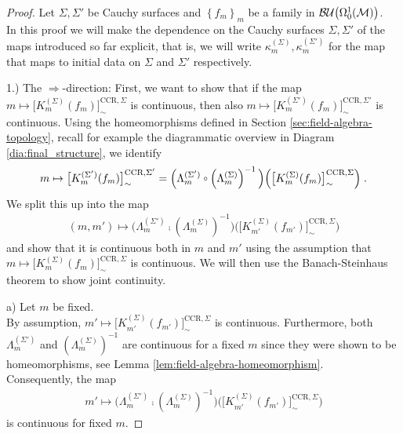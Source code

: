 \begin{proof}
	Let $\Sigma, \Sigma'$ be Cauchy surfaces and $\left\{ f_m \right\}_m$ be a family in ${\mathcal{BU}\big(\Omega^1_0(\mathcal{M})\big)}$.\\
In this proof we will make the dependence on the Cauchy surfaces $\Sigma, \Sigma'$ of the maps introduced so far explicit, that is, we will write $\kappa_m^{(\Sigma)}, \kappa_m^{(\Sigma')}$ for the map that maps to initial data on $\Sigma$ and $\Sigma'$ respectively.\par
1.) The $\Rightarrow$-direction: First, we want to show that if the map $m \mapsto \big[  K_m^{(\Sigma)}(f_m) \big]_\sim^{\text{CCR},\Sigma}$ is continuous, then also $m \mapsto \big[  K_m^{(\Sigma')}(f_m) \big]_\sim^{\text{CCR},\Sigma'}$ is continuous. Using the homeomorphisms defined in Section \ref{sec:field-algebra-topology}, recall for example the diagrammatic overview in Diagram \ref{dia:final_structure}, we identify
\begin{align}
	m \mapsto \big[  K_m^{(\Sigma')}(f_m) \big]_\sim^{\text{CCR},\Sigma'} = \Big( \Lambda^{(\Sigma')}_m \comp \left( \Lambda^{(\Sigma)}_m \right)^{-1} \Big) \Big(  \big[ K_m^{(\Sigma)}  (f_m)\big]_\sim^{\text{CCR}, \Sigma}\Big) \formspace.
\end{align}
We split this up into the map
\begin{align}
(m,m') \mapsto \Big( \Lambda^{(\Sigma')}_m \comp \left( \Lambda^{(\Sigma)}_m \right)^{-1} \Big) \Big(  \big[ K_{m'}^{(\Sigma)}  (f_{m'})\big]_\sim^{\text{CCR}, \Sigma}\Big)
\end{align}
and show that it is continuous both in $m$ and $m'$ using the assumption that $m \mapsto  \big[ K_m^{(\Sigma)}(f_m) \big]_\sim^{\text{CCR},\Sigma} $ is continuous. We will then use the Banach-Steinhaus theorem to show joint continuity.\par
a) Let $m$ be fixed.\\
By assumption, $m' \mapsto  \big[ K_{m'}^{(\Sigma)}(f_{m'}) \big]_\sim^{\text{CCR},\Sigma} $ is continuous. Furthermore, both $\Lambda^{(\Sigma')}_{m}$ and $\left( \Lambda^{(\Sigma)}_{m} \right)^{-1}$ are continuous for a fixed $m$ since they were shown to be homeomorphisms, see Lemma \ref{lem:field-algebra-homeomorphism}.\\
Consequently, the map
\begin{align}
	m' \mapsto  \Big( \Lambda^{(\Sigma')}_m \comp \left( \Lambda^{(\Sigma)}_m \right)^{-1} \Big) \Big(  \big[ K_{m'}^{(\Sigma)}  (f_{m'})\big]_\sim^{\text{CCR}, \Sigma}\Big)
\end{align}
is continuous for fixed $m$.\par

\end{proof}

